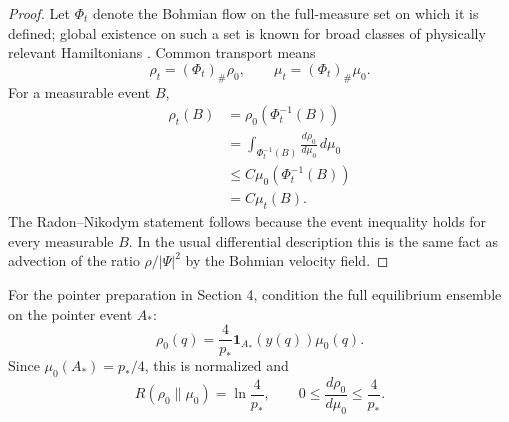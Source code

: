 \documentclass[pdflatex,sn-mathphys-num]{sn-jnl}
\theoremstyle{thmstyleone}
\begin{document}
\begin{proof}
Let $\Phi_t$ denote the Bohmian flow on the full-measure set on which it is defined; global existence on such a set is known for broad classes of physically relevant Hamiltonians \cite{Berndl1995}. Common transport means
\begin{equation}
\rho_t=(\Phi_t)_\#\rho_0,
\qquad
\mu_t=(\Phi_t)_\#\mu_0.
\end{equation}
For a measurable event $B$,
\begin{align}
\rho_t(B)
&=\rho_0(\Phi_t^{-1}(B))\\
&=\int_{\Phi_t^{-1}(B)}\frac{d\rho_0}{d\mu_0}\,d\mu_0\\
&\le C\mu_0(\Phi_t^{-1}(B))\\
&=C\mu_t(B).
\end{align}
The Radon--Nikodym statement follows because the event inequality holds for every measurable $B$. In the usual differential description this is the same fact as advection of the ratio $\rho/|\Psi|^2$ by the Bohmian velocity field.
\end{proof}

For the pointer preparation in Section 4, condition the full equilibrium ensemble on the pointer event $A_*$:
\begin{equation}
\rho_0(q)=\frac4{p_*}\mathbf 1_{A_*}(y(q))\mu_0(q).
\label{eq:fullconditioned}
\end{equation}
Since $\mu_0(A_*)=p_*/4$, this is normalized and
\begin{equation}
R(\rho_0\|\mu_0)=\ln\frac4{p_*},
\qquad
0\le\frac{d\rho_0}{d\mu_0}\le\frac4{p_*}.
\label{eq:ratioBound}
\end{equation}
\end{document}
